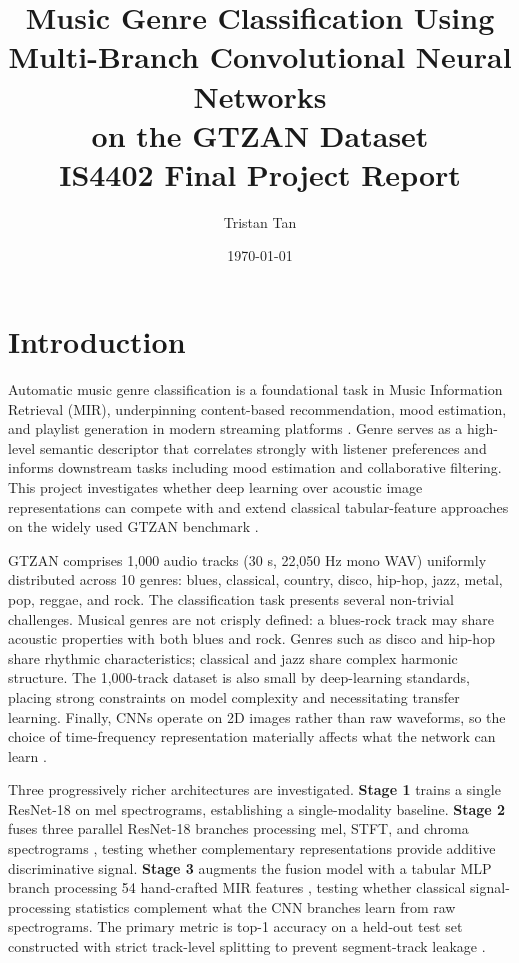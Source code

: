 \documentclass[10pt, twocolumn, a4paper]{article}
\title{
    \large\textbf{Music Genre Classification Using\\
    Multi-Branch Convolutional Neural Networks\\
    on the GTZAN Dataset}\\[0.4em]
    \normalsize IS4402 Final Project Report
}
\author{Tristan Tan}
\date{\today}
\begin{document}
\maketitle

\section{Introduction}

Automatic music genre classification is a foundational task in Music Information Retrieval (MIR), underpinning content-based recommendation, mood estimation, and playlist generation in modern streaming platforms \cite{tzanetakis2002}. Genre serves as a high-level semantic descriptor that correlates strongly with listener preferences and informs downstream tasks including mood estimation and collaborative filtering. This project investigates whether deep learning over acoustic image representations can compete with and extend classical tabular-feature approaches on the widely used GTZAN benchmark \cite{tzanetakis2002, sturm2013}.

GTZAN comprises 1,000 audio tracks (30 s, 22,050 Hz mono WAV) uniformly distributed across 10 genres: blues, classical, country, disco, hip-hop, jazz, metal, pop, reggae, and rock. The classification task presents several non-trivial challenges. Musical genres are not crisply defined: a blues-rock track may share acoustic properties with both blues and rock. Genres such as disco and hip-hop share rhythmic characteristics; classical and jazz share complex harmonic structure. The 1,000-track dataset is also small by deep-learning standards, placing strong constraints on model complexity and necessitating transfer learning. Finally, CNNs operate on 2D images rather than raw waveforms, so the choice of time-frequency representation materially affects what the network can learn \cite{wolfmonheim2024}.

Three progressively richer architectures are investigated. \textbf{Stage 1} trains a single ResNet-18 \cite{he2016} on mel spectrograms, establishing a single-modality baseline. \textbf{Stage 2} fuses three parallel ResNet-18 branches processing mel, STFT, and chroma spectrograms \cite{zhang2025}, testing whether complementary representations provide additive discriminative signal. \textbf{Stage 3} augments the fusion model with a tabular MLP branch processing 54 hand-crafted MIR features \cite{tzanetakis2002}, testing whether classical signal-processing statistics complement what the CNN branches learn from raw spectrograms. The primary metric is top-1 accuracy on a held-out test set constructed with strict track-level splitting to prevent segment-track leakage \cite{sturm2013}.
\end{document}
